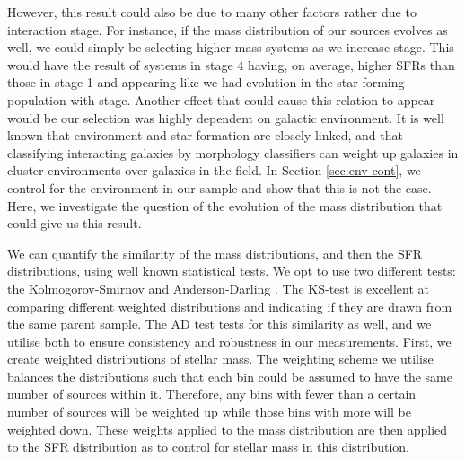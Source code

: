 However, this result could also be due to many other factors rather due to interaction stage. For instance, if the mass distribution of our sources evolves as well, we could simply be selecting higher mass systems as we increase stage. This would have the result of systems in stage 4 having, on average, higher SFRs than those in stage 1 and appearing like we had evolution in the star forming population with stage. Another effect that could cause this relation to appear would be our selection was highly dependent on galactic environment. It is well known that environment and star formation are closely linked, and that classifying interacting galaxies by morphology classifiers can weight up galaxies in cluster environments over galaxies in the field. In Section \ref{sec:env-cont}, we control for the environment in our sample and show that this is not the case. Here, we investigate the question of the evolution of the mass distribution that could give us this result.

We can quantify the similarity of the mass distributions, and then the SFR distributions, using well known statistical tests. We opt to use two different tests: the Kolmogorov-Smirnov \citep[KS-test;][]{an1933sulla} and Anderson-Darling \citep[AD-test;][]{stephens_74}. The KS-test is excellent at comparing different weighted distributions and indicating if they are drawn from the same parent sample. The AD test tests for this similarity as well, and we utilise both to ensure consistency and robustness in our measurements. First, we create weighted distributions of stellar mass. The weighting scheme we utilise balances the distributions such that each bin could be assumed to have the same number of sources within it. Therefore, any bins with fewer than a certain number of sources will be weighted up while those bins with more will be weighted down. These weights applied to the mass distribution are then applied to the SFR distribution as to control for stellar mass in this distribution.

